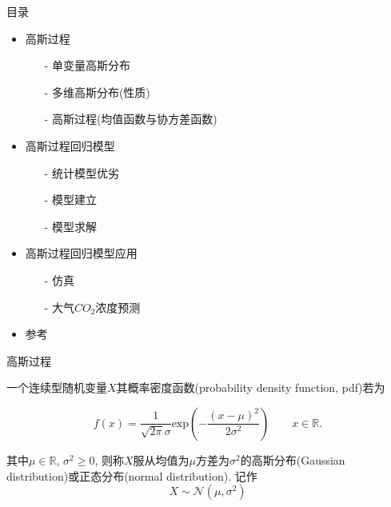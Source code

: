 

\begin{frame}{目录}
    \begin{itemize}
        \item 高斯过程
        \begin{itemize}
            \item[-] 单变量高斯分布
            \item[-] 多维高斯分布(性质)
            \item[-] 高斯过程(均值函数与协方差函数)
        \end{itemize}

        \item 高斯过程回归模型
        \begin{itemize}
            \item[-] 统计模型优劣
            \item[-] 模型建立
            \item[-] 模型求解
        \end{itemize}

        \item 高斯过程回归模型应用
        \begin{itemize}
            \item[-] 仿真
            \item[-] 大气$CO_{2}$浓度预测
        \end{itemize}

        \item 参考
    \end{itemize}
\end{frame}


\begin{frame}[fragile]{高斯过程}
    \begin{definition}[高斯分布]
        \vspace{2ex}
        一个连续型随机变量$X$其概率密度函数(probability density function, pdf)若为
        
        \begin{equation}
            f(x)=\frac{1}{\sqrt{2\pi}\sigma}\mathrm{exp}\left(-\frac{(x-\mu)^2}{2\sigma^{2}}\right)\qquad x\in \mathds{R}. 
        \end{equation}

        其中$\mu\in\mathds{R}$, $\sigma^{2}\geqslant 0$, 则称$X$服从均值为$\mu$方差为$\sigma^{2}$的高斯分布(Gaussian distribution)或正态分布(normal distribution). 记作
        $$X\sim\mathcal{N}(\mu, \sigma^{2})$$
    \end{definition}
\end{frame}


